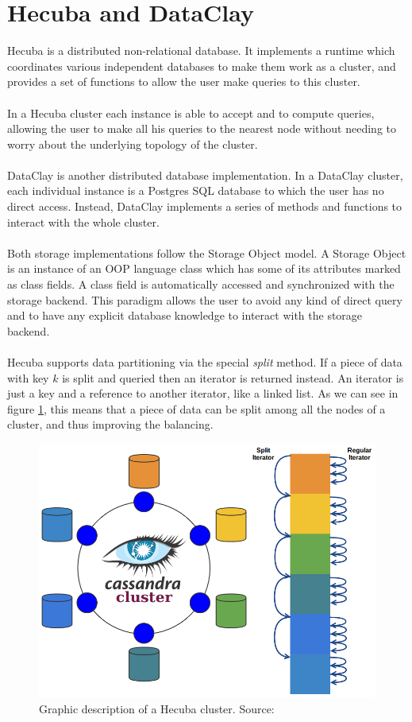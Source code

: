\section{Hecuba and DataClay}
\label{sec:hecuba}
Hecuba \cite{alomar2015hecuba} is a distributed non-relational database. It implements a runtime which coordinates various independent databases to make them work as a cluster, and provides a set of functions to allow the user make queries to this cluster.\\
\\
In a Hecuba cluster each instance is able to accept and to compute queries, allowing the user to make all his queries to the nearest node without needing to worry about the underlying topology of the cluster.\\
\\
DataClay \cite{DataClay} is another distributed database implementation. In a DataClay cluster, each individual instance is a Postgres SQL database to which the user has no direct access. Instead, DataClay implements a series of methods and functions to interact with the whole cluster.\\
\\
Both storage implementations follow the Storage Object model. A Storage Object is an instance of an OOP language class which has some of its attributes marked as class fields. A class field is automatically accessed and synchronized with the storage backend. This paradigm allows the user to avoid any kind of direct query and to have any explicit database knowledge to interact with the storage backend.\\
\\
Hecuba supports data partitioning via the special \textit{split} method. If a piece of data with key $k$ is split and queried then an iterator is returned instead. An iterator is just a key and a reference to another iterator, like a linked list. As we can see in figure \ref{fig:hecuba_cluster}, this means that a piece of data can be split among all the nodes of a cluster, and thus improving the balancing.
\begin{figure}
    \centering
    \includegraphics[scale = 0.25]{figures/HecubaIterators.png}
    \caption{Graphic description of a Hecuba cluster. Source: \cite{alomar2015hecuba}}
    \label{fig:hecuba_cluster}
\end{figure}
\newpage